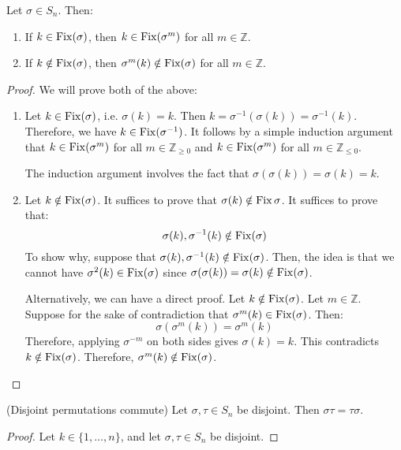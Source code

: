 \begin{itemize}
\begin{equation}
    \end{equation}
    \begin{lemma}
        Let $\sigma \in S_n$. Then:
        \begin{enumerate}
            \item If $k\in \operatorname{Fix}(\sigma)$, then $k\in \operatorname{Fix}(\sigma^m)$ for all $m\in \mathbb{Z}$.
            \item If $k\notin \operatorname{Fix}(\sigma)$, then $\sigma^m (k) \notin \operatorname{Fix}(\sigma)$ for all $m\in \mathbb{Z}$.
        \end{enumerate}
    \end{lemma}
    \begin{proof}
        We will prove both of the above:
        \begin{enumerate}
            \item Let $k\in \operatorname{Fix}(\sigma)$, i.e. $\sigma(k)=k$. Then $k=\sigma^{-1}(\sigma(k))=\sigma^{-1}(k)$. Therefore, we have $k\in \operatorname{Fix}(\sigma^{-1})$. It follows by a simple induction argument that $k \in \operatorname{Fix}(\sigma^m)$ for all $m\in \mathbb{Z}_{\ge 0}$ and $k\in \operatorname{Fix}(\sigma^m)$ for all $m\in \mathbb{Z}_{\le 0}$.
            
            The induction argument involves the fact that $\sigma(\sigma(k))=\sigma(k)=k$.
            \item Let $k\notin \operatorname{Fix}(\sigma)$. It suffices to prove that $\sigma(k) \notin \operatorname{Fix} \sigma$. It suffices to prove that:
            \begin{equation}
                \sigma(k),\sigma^{-1}(k) \notin \operatorname{Fix}(\sigma)
            \end{equation}
            To show why, suppose that $\sigma(k), \sigma^{-1}(k) \notin \operatorname{Fix}(\sigma)$. Then, the idea is that we cannot have $\sigma^2(k) \in \operatorname{Fix}(\sigma)$ since $\sigma(\sigma(k))=\sigma(k) \notin \operatorname{Fix}(\sigma)$.

            Alternatively, we can have a direct proof. Let $k \notin \operatorname{Fix}(\sigma)$. Let $m\in \mathbb{Z}$. Suppose for the sake of contradiction that $\sigma^m(k) \in \operatorname{Fix}(\sigma)$. Then:
            \begin{equation}
                \sigma(\sigma^m(k)) = \sigma^m(k)
            \end{equation}
            Therefore, applying $\sigma^{-m}$ on both sides gives $\sigma(k)=k$. This contradicts $k\notin \operatorname{Fix}(\sigma)$. Therefore, $\sigma^m(k) \notin \operatorname{Fix}(\sigma)$.
        \end{enumerate}
    \end{proof}
    \begin{theorem}
        (Disjoint permutations commute) Let $\sigma,\tau \in S_n$ be disjoint. Then $\sigma\tau = \tau\sigma$.
    \end{theorem}
    \begin{proof}
        Let $k\in \{1,\dots,n\}$, and let $\sigma, \tau \in S_n$ be disjoint.


\end{proof}
\end{itemize}
